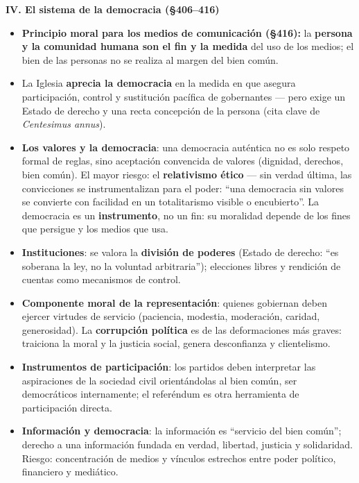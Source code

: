 \documentclass[10pt,a4paper]{article}
\begin{document}
\medskip\noindent \textbf{IV. El sistema de la democracia (\S{}406--416)}\par\nopagebreak
\begin{itemize}
\item \textbf{Principio moral para los medios de comunicación (\S{}416):} la \textbf{persona y la comunidad humana son el fin y la medida} del uso de los medios; el bien de las personas no se realiza al margen del bien común.
\item La Iglesia \textbf{aprecia la democracia} en la medida en que asegura participación, control y sustitución pacífica de gobernantes --- pero exige un Estado de derecho y una recta concepción de la persona (cita clave de \textit{Centesimus annus}).
\item \textbf{Los valores y la democracia}: una democracia auténtica no es solo respeto formal de reglas, sino aceptación convencida de valores (dignidad, derechos, bien común). El mayor riesgo: el \textbf{relativismo ético} --- sin verdad última, las convicciones se instrumentalizan para el poder: ``una democracia sin valores se convierte con facilidad en un totalitarismo visible o encubierto''. La democracia es un \textbf{instrumento}, no un fin: su moralidad depende de los fines que persigue y los medios que usa.
\item \textbf{Instituciones}: se valora la \textbf{división de poderes} (Estado de derecho: ``es soberana la ley, no la voluntad arbitraria''); elecciones libres y rendición de cuentas como mecanismos de control.
\item \textbf{Componente moral de la representación}: quienes gobiernan deben ejercer virtudes de servicio (paciencia, modestia, moderación, caridad, generosidad). La \textbf{corrupción política} es de las deformaciones más graves: traiciona la moral y la justicia social, genera desconfianza y clientelismo.
\item \textbf{Instrumentos de participación}: los partidos deben interpretar las aspiraciones de la sociedad civil orientándolas al bien común, ser democráticos internamente; el referéndum es otra herramienta de participación directa.
\item \textbf{Información y democracia}: la información es ``servicio del bien común''; derecho a una información fundada en verdad, libertad, justicia y solidaridad. Riesgo: concentración de medios y vínculos estrechos entre poder político, financiero y mediático.
\end{itemize}
\end{document}
